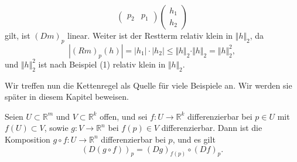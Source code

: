 \documentclass[../main.tex]{subfiles}
\begin{document}
\begin{examples}
\begin{enumerate}[(1)]
\[\begin{pmatrix}
          p_2 & p_1
        \end{pmatrix}
        \begin{pmatrix}
          h_1 \\ h_2
        \end{pmatrix}
      \]
      gilt, ist ${(Dm)}_p$ linear.
      Weiter ist der Restterm
      relativ klein in $\Vert h \Vert_2$, da
      \[
        |{(Rm)}_p(h)| = |h_1| \cdot |h_2| \leq \Vert h \Vert_2 \cdot
        \Vert h \Vert_2 = \Vert h \Vert_2^2,
      \]
      und $\Vert h \Vert_2^2$ ist nach Beispiel (1)
      relativ klein in $\Vert h \Vert_2$.
  \end{enumerate}
\end{examples}

Wir treffen nun die Kettenregel als Quelle
für viele Beispiele an.
Wir werden sie später in diesem Kapitel beweisen.

\begin{theorem*}[Kettenregel]
  Seien $U \subset \mathbb{R}^m$ und $V \subset \mathbb{R}^k$
  offen, und sei $f \colon U \to \mathbb{R}^k$ differenzierbar
  bei $p \in U$ mit $f(U) \subset V$,
  sowie $g \colon V \to \mathbb{R}^n$ bei $f(p) \in V$
  differenzierbar.
  Dann ist die Komposition $g \circ f \colon U \to \mathbb{R}^n$
  differenzierbar bei $p$, und es gilt
  \[
    {(D(g \circ f))}_p = {(Dg)}_{f(p)} \circ {(Df)}_p.
  \]
\end{theorem*}
\end{document}
